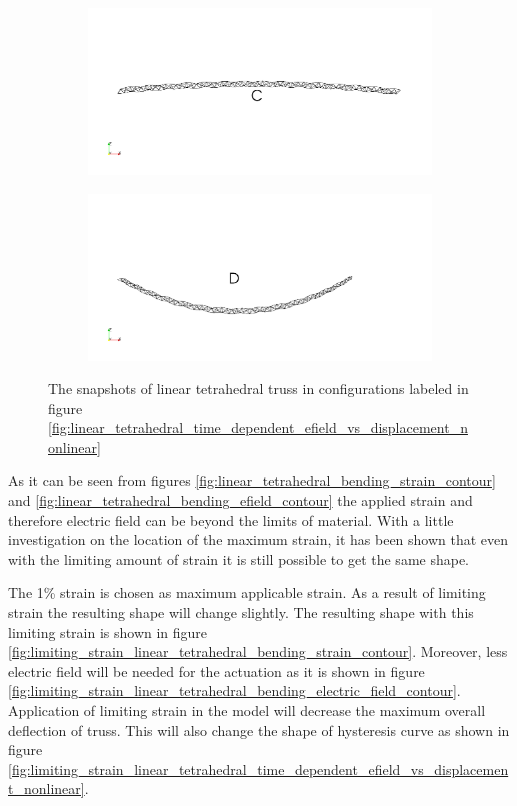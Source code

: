 \begin{figure}
\begin{subfigure}{.5\textwidth} 
  \centering
  \includegraphics[width=.8\linewidth]{./chap_5_active_trusses/images_non_linear_time_dependent_constitutive_equatio/linear_tetrahedral_bending_snapshop_C.png}
  \label{fig:sfigC}
\end{subfigure}%
\begin{subfigure}{.5\textwidth}
  \centering
  \includegraphics[width=.8\linewidth]{./chap_5_active_trusses/images_non_linear_time_dependent_constitutive_equatio/linear_tetrahedral_bending_snapshop_D.png}
  \label{fig:sfigD}
\end{subfigure}
\caption{The snapshots of linear tetrahedral truss in configurations labeled in figure \ref{fig:linear_tetrahedral_time_dependent_efield_vs_displacement_nonlinear}}
\label{fig:linear_tetrahedral_time_dependent_efield_vs_displacement_nonlinear_snapshot}
\end{figure}


As it can be seen from figures \ref{fig:linear_tetrahedral_bending_strain_contour} and \ref{fig:linear_tetrahedral_bending_efield_contour} the applied strain and therefore electric field can be beyond the limits of material. With a little investigation on the location of the maximum strain, it has been shown that even with the limiting amount of strain it is still possible to get the same shape.

The 1\% strain is chosen as maximum applicable strain.
As a result of limiting strain the resulting shape will change slightly.
The resulting shape with this limiting strain is shown in figure \ref{fig:limiting_strain_linear_tetrahedral_bending_strain_contour}.
Moreover, less electric field will be needed for the actuation as it is shown in figure \ref{fig:limiting_strain_linear_tetrahedral_bending_electric_field_contour}. 
Application of limiting strain in the model will decrease the maximum overall deflection of truss.
This will also change the shape of hysteresis curve as shown in figure  \ref{fig:limiting_strain_linear_tetrahedral_time_dependent_efield_vs_displacement_nonlinear}.

